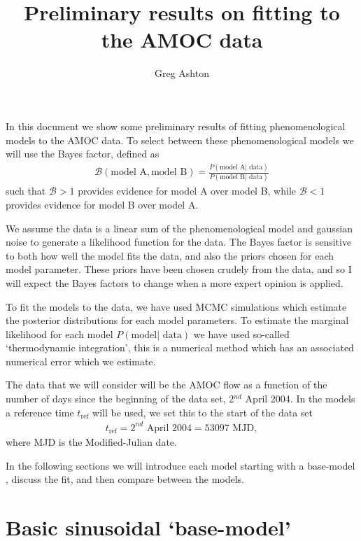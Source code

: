 \documentclass{article}
\newcommand{\tref}{t_{\textrm{ref}}}
\begin{document}

\title{Preliminary results on fitting to the AMOC data}
\author{Greg Ashton}
\date{}
\maketitle

In this document we show some preliminary results of fitting phenomenological models
to the AMOC data. To select between these phenomenological models we will use the
Bayes factor, defined as
\begin{align}
\mathcal{B}(\textrm{model A}, \textrm{model B}) = \frac{P(\textrm{model A}| \textrm{ data})}{P(\textrm{model B}| \textrm{ data})}
\label{eqn: Bayes}
\end{align}
such that $\mathcal{B} > 1$ provides evidence for model A over model B, while
$\mathcal{B} < 1$ provides evidence for model B over model A. 

We assume the data is a linear sum of the phenomenological model and
gaussian noise to generate a likelihood function for the data. The Bayes factor
is sensitive to both how well the model fits the data, and also the priors chosen
for each model parameter. These priors have been chosen crudely from the data,
and so I will expect the Bayes factors to change when a more expert opinion is
applied.

To fit the models to the data, we have used MCMC simulations which estimate the
posterior distributions for each model parameters. To estimate the marginal
likelihood for each model $P(\textrm{model}| \textrm{ data})$ we have used
so-called `thermodynamic integration', this is a numerical method which has an
associated numerical error which we estimate.

The data that we will consider will be the AMOC flow as a function of the number
of days since the beginning of the data set, 2$^{nd}$ April 2004. In the models a
reference time $\tref$ will be used, we set this to the start of the data set
\begin{align}
\tref = \textrm{2}^{nd}\textrm{ April 2004} = 53097 \textrm{ MJD},
\end{align}
where MJD is the Modified-Julian date.

In the following sections we will introduce each model starting with a
base-model , discuss the fit, and then compare between the models.

\section{Basic sinusoidal `base-model'}
\end{document}
